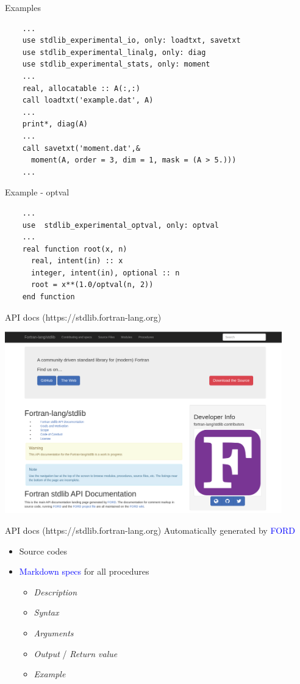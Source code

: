 \documentclass{beamer}
\begin{document}
\begin{frame}[fragile]{Examples}
	\begin{lstlisting}
	...
	use stdlib_experimental_io, only: loadtxt, savetxt
	use stdlib_experimental_linalg, only: diag
	use stdlib_experimental_stats, only: moment
	...
	real, allocatable :: A(:,:)
	call loadtxt('example.dat', A)
	...
	print*, diag(A)
	...
 	call savetxt('moment.dat',&
	  moment(A, order = 3, dim = 1, mask = (A > 5.)))
	...	\end{lstlisting}
\end{frame}


\begin{frame}[fragile]{Example - optval}
	\begin{lstlisting}
	...
	use  stdlib_experimental_optval, only: optval
	...
	real function root(x, n)
	  real, intent(in) :: x
	  integer, intent(in), optional :: n
	  root = x**(1.0/optval(n, 2))
	end function
	\end{lstlisting}
\end{frame}


\begin{frame}[c]{API docs (https://stdlib.fortran-lang.org)}
	\begin{center}
	\includegraphics[width=0.9\textwidth]{apidocsstdlib}
	\end{center}
\end{frame}


\begin{frame}[c]{API docs (https://stdlib.fortran-lang.org)}
	Automatically generated by \textcolor{blue}{FORD} %
	\begin{itemize}
		\item Source codes
		\item \textcolor{blue}{Markdown specs} for all procedures
		\begin{itemize}
			\item \textit{Description}
			\item \textit{Syntax}
			\item \textit{Arguments}
			\item \textit{Output} / \textit{Return value}
			\item \textit{Example}
		\end{itemize}
	\end{itemize}

\end{frame}
\end{document}
